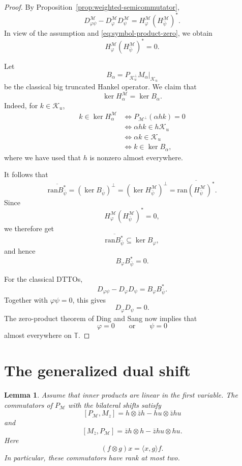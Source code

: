 \documentclass[12pt]{amsart}
\newtheorem{lemma}[theorem]{Lemma}
\theoremstyle{definition}
\theoremstyle{remark}
\def \T{\mathbb{T}}
\newcommand{\clm}{\mathcal{M}}
\newcommand{\clk}{\mathcal{K}}
\newcommand{\ran}{\mathrm{ran}}
\newcommand{\vp}{\varphi}
\numberwithin{equation}{section}
\begin{document}
\begin{proof}
By Proposition~\ref{prop:weighted-semicommutator},
\[
D_{\vp\psi}^\clm-D_\vp^\clm D_\psi^\clm
=
H_\vp^\clm(H_{\bar\psi}^\clm)^*.
\]
In view of the assumption and \eqref{eq:symbol-product-zero}, we obtain
\[
H_\vp^\clm(H_{\bar\psi}^\clm)^*=0.
\]

Let
\[
B_\alpha
=
P_{\clk_u^\perp}M_\alpha\big|_{\clk_u}
\]
be the classical big truncated Hankel operator. We claim that
\[
\ker H_\alpha^\clm=\ker B_\alpha.
\]
Indeed, for $k\in\clk_u$,
\begin{align*}
k\in\ker H_\alpha^\clm
&\iff
P_{\clm^\perp}(\alpha hk)=0 \\
&\iff
\alpha hk\in h\clk_u \\
&\iff
\alpha k\in\clk_u \\
&\iff
k\in\ker B_\alpha,
\end{align*}
where we have used that $h$ is nonzero almost everywhere.

It follows that
\[
\overline{\ran B_{\bar\psi}^*}
=
(\ker B_{\bar\psi})^\perp
=
(\ker H_{\bar\psi}^\clm)^\perp
=
\overline{\ran (H_{\bar\psi}^\clm)^*}.
\]
Since
\[
H_\vp^\clm(H_{\bar\psi}^\clm)^*=0,
\]
we therefore get
\[
\overline{\ran B_{\bar\psi}^*}
\subseteq
\ker B_\vp,
\]
and hence
\[
B_\vp B_{\bar\psi}^*=0.
\]

For the classical DTTOs,
\[
D_{\vp\psi}-D_\vp D_\psi
=
B_\vp B_{\bar\psi}^*.
\]
Together with \(\vp\psi=0\), this gives
\[
D_\vp D_\psi=0.
\]
The zero-product theorem of Ding and Sang
\cite[Theorem~3.4]{Sang:Ding} now implies that
\[
\vp=0
\qquad\text{or}\qquad
\psi=0
\]
almost everywhere on $\T$.
\end{proof}













\section{The generalized dual shift}
\begin{lemma}\label{lem:commutators}
Assume that inner products are linear in the first variable. The commutators of $P_\clm$ with the bilateral shifts satisfy
\[
[P_\clm,M_z]
=
h\otimes \bar{z} h
-
hu\otimes \bar{z} hu
\]
and
\[
[M_{\bar{z}},P_\clm]
=
\bar{z} h\otimes h
-
\bar{z} hu\otimes hu.
\]
Here
\[
(f\otimes g)x=\langle x,g\rangle f.
\]
In particular, these commutators have rank at most two.
\end{lemma}
\end{document}
